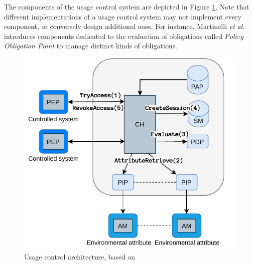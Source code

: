 The components of the usage control system are depicted in Figure \ref{F_ucon_components}. Note that different implementations of a usage control system may not implement every component, or conversely design additional ones. For instance, Martinelli \emph{et al.} \cite{Martinelli2019} introduces components dedicated to the evaluation of obligations called \emph{Policy Obligation Point} to manage distinct kinds of obligations.
\begin{figure}[t]
\centering
 \includegraphics[scale=0.9]{Images/ucon_framework.pdf}
\caption{Usage control architecture, based on~\cite{Rizos2019}}
\label{F_ucon_components}
\end{figure}

